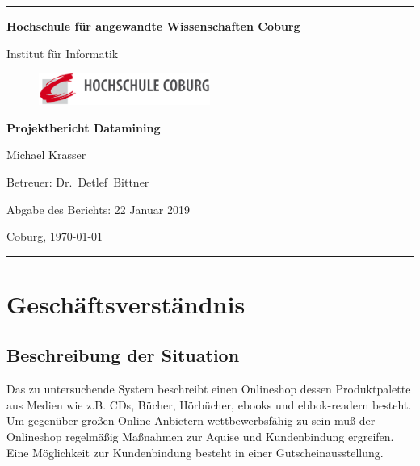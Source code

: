 \documentclass[a4paper,12pt]{article}
\begin{document}
\begin{titlepage}
\thispagestyle{empty} \enlargethispage{1.4in}

\begin{center}

\rule[1ex]{157.5mm}{0.5mm}

\LARGE\bf Hochschule für angewandte Wissenschaften Coburg\\

\vfill

\rm Institut für Informatik


\begin{figure}
	    \centering
				     \includegraphics[width=0.5\textwidth]{Logo.png}
\end{figure}

\vfill

\Huge \bf Projektbericht Datamining

\vfill

\normalsize Michael Krasser

\vfill

Betreuer:  Dr.~Detlef~Bittner

Abgabe des Berichts: 22 Januar 2019

\vfill

Coburg, \today

\rule[-1ex]{157.5mm}{0.5mm}

\vfill

\end{center}

\end{titlepage}

\newpage
\tableofcontents
\pagebreak
\section{Geschäftsverständnis}
\subsection{Beschreibung der Situation}
Das zu untersuchende System beschreibt einen Onlineshop dessen Produktpalette aus Medien wie z.B. CDs, Bücher, Hörbücher, ebooks und ebbok-readern besteht. Um gegenüber großen Online-Anbietern wettbewerbsfähig zu sein muß der Onlineshop regelmäßig Maßnahmen zur Aquise und Kundenbindung ergreifen. Eine Möglichkeit zur Kundenbindung besteht in einer Gutscheinausstellung. 
\end{document}
